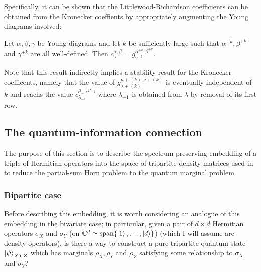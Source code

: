 \documentclass[notitlepage]{article}
\begin{document}
Specifically, it can be shown that the Littlewood-Richardson coefficients can be obtained from the Kronecker coeffients by appropriately augmenting the Young diagrams involved:
\begin{cor}
    Let $\alpha, \beta, \gamma$ be Young diagrams and let $k$ be sufficiently large such that $\alpha^{+k}, \beta^{+k}$ and $\gamma^{+k}$ are all well-defined.
    Then $c_{\gamma}^{\alpha, \beta} = g_{\gamma^{+k}}^{\alpha^{+k}, \beta^{+k}}$.
\end{cor}

\begin{rem}
    Note that this result indirectly implies a stability result for the Kronecker coefficents, namely that the value of $g_{\lambda + (k)}^{\mu + (k), \nu + (k)}$ is eventually independent of $k$ and reachs the value $c_{\lambda_{-1}}^{\mu_{-1}, \nu_{-1}}$ where $\lambda_{-1}$ is obtained from $\lambda$ by removal of its first row.
\end{rem}

\subsection{The quantum-information connection}

The purpose of this section is to describe the spectrum-preserving embedding of a triple of Hermitian operators into the space of tripartite density matrices used in \cite{christandl2018recoupling} to reduce the partial-sum Horn problem to the quantum marginal problem.

\subsubsection{Bipartite case}

Before describing this embedding, it is worth considering an analogue of this embedding in the bivariate case; in particular, given a pair of $d\times d$ Hermitian operators $\sigma_X$ and $\sigma_Y$ (on $\mathbb C^{d} \simeq \mathrm{span}\{\ket 1, \ldots, \ket d\}$) (which I will assume are density operators), is there a way to construct a pure tripartite quantum state $\ket \psi_{XYZ}$ which has marginals $\rho_X, \rho_Y$ and $\rho_Z$ satisfying some relationship to $\sigma_X$ and $\sigma_Y$?
\end{document}
